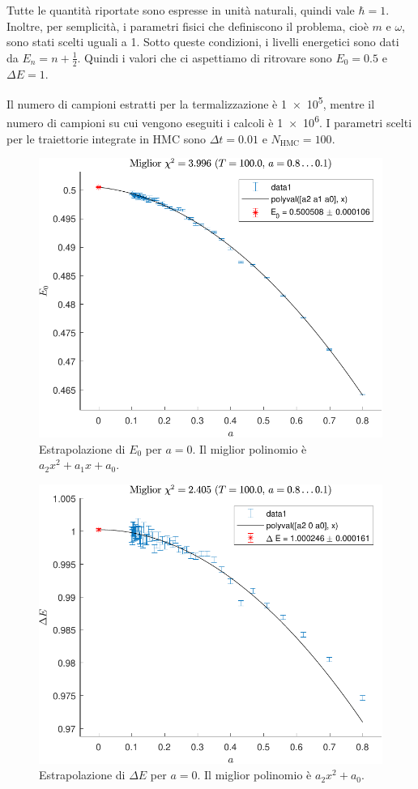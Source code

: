 \documentclass[11pt, a4paper]{article}
\begin{document}
Tutte le quantità riportate sono espresse in unità naturali, quindi vale $\hbar = 1$. Inoltre, per semplicità, i parametri fisici che definiscono il problema, cioè $m$ e $\omega$, sono stati scelti uguali a 1.
Sotto queste condizioni, i livelli energetici sono dati da $E_n = n + \frac{1}{2}$. Quindi i valori che ci aspettiamo di ritrovare sono $E_0 = 0.5$ e $\Delta E = 1$.

Il numero di campioni estratti per la termalizzazione è \num{1e5}, mentre il numero di campioni su cui vengono eseguiti i calcoli è \num{1e6}.
I parametri scelti per le traiettorie integrate in HMC sono $\Delta t = 0.01$ e $N_{\mathrm{HMC}} = 100$.

\begin{figure}[H]
  \centering
  \includegraphics{../plots/qho/final/extrap_E0_fit-crop.pdf}
  \caption{Estrapolazione di $E_0$ per $a=0$. Il miglior polinomio è $a_2 x^2 + a_1 x + a_0$.}
\end{figure}

\begin{figure}[H]
  \centering
  \includegraphics{../plots/qho/final/extrap_DeltaE_fit-crop.pdf}
  \caption{Estrapolazione di $\Delta E$ per $a=0$. Il miglior polinomio è $a_2 x^2 + a_0$.}
\end{figure}
\end{document}
